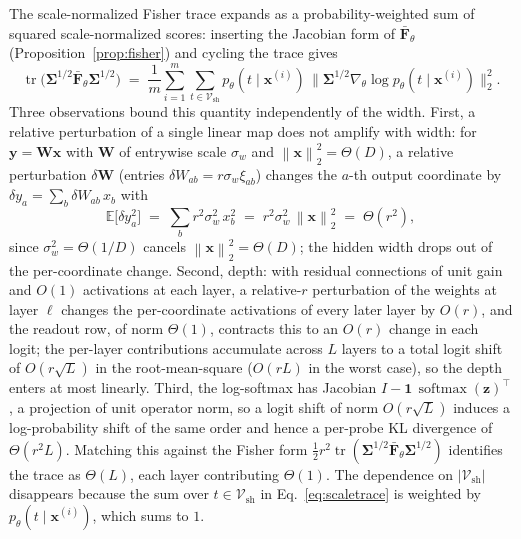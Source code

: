 \documentclass[11pt]{article}
\newcommand{\Vsh}{\mathcal{V}_{\mathrm{sh}}}
\newcommand{\E}{\mathbb{E}}
\newcommand{\norm}[1]{\left\lVert #1 \right\rVert}
\newcommand{\softmax}{\operatorname{softmax}}
\theoremstyle{definition}
\begin{document}
The scale-normalized Fisher trace expands as a probability-weighted sum of
squared scale-normalized scores: inserting the Jacobian form of
$\bar{\bm{F}}_\theta$ (Proposition~\ref{prop:fisher}) and cycling the trace
gives
\begin{equation}
  \operatorname{tr}\!\big(\bm{\Sigma}^{1/2}\bar{\bm{F}}_\theta
  \bm{\Sigma}^{1/2}\big)
  \;=\; \frac1m \sum_{i=1}^m \sum_{t \in \Vsh} p_\theta(t \mid \bm{x}^{(i)})\,
  \big\|\bm{\Sigma}^{1/2}\nabla_\theta \log p_\theta(t \mid \bm{x}^{(i)})\big\|_2^2.
  \label{eq:scaletrace}
\end{equation}
Three observations bound this quantity independently of the width. First, a
relative perturbation of a single linear map does not amplify with width: for
$\bm{y} = \bm{W} \bm{x}$ with $\bm{W}$ of entrywise scale $\sigma_w$ and
$\norm{\bm{x}}_2^2 = \Theta(D)$, a relative perturbation $\delta\bm{W}$ (entries
$\delta W_{ab} = r\sigma_w\xi_{ab}$) changes the $a$-th output coordinate by
$\delta y_a = \sum_b \delta W_{ab}\, x_b$ with
\begin{equation}
  \E\big[\delta y_a^2\big]
  \;=\; \sum_b r^2\sigma_w^2\, x_b^2
  \;=\; r^2\sigma_w^2\,\norm{\bm{x}}_2^2
  \;=\; \Theta(r^2),
  \label{eq:widthnorm}
\end{equation}
since $\sigma_w^2 = \Theta(1/D)$ cancels $\norm{\bm{x}}_2^2 = \Theta(D)$; the
hidden width drops out of the per-coordinate change. Second, depth: with
residual connections of unit gain and $O(1)$ activations at each layer, a
relative-$r$ perturbation of the weights at layer $\ell$ changes the
per-coordinate activations of every later layer by $O(r)$, and the readout row,
of norm $\Theta(1)$, contracts this to an $O(r)$ change in each logit; the
per-layer contributions accumulate across $L$ layers to a total logit shift of
$O(r\sqrt{L})$ in the root-mean-square ($O(rL)$ in the worst case), so the
depth enters at most linearly. Third, the log-softmax has Jacobian
$I - \mathbf{1}\,\softmax(\bm{z})^\top$, a projection of unit operator norm, so
a logit shift of norm $O(r\sqrt{L})$ induces a log-probability shift of the
same order and hence a per-probe KL divergence of $\Theta(r^2 L)$. Matching
this against the Fisher form $\tfrac12 r^2 \operatorname{tr}(\bm{\Sigma}^{1/2}
\bar{\bm{F}}_\theta\bm{\Sigma}^{1/2})$ identifies the trace as $\Theta(L)$,
each layer contributing $\Theta(1)$. The dependence on $|\Vsh|$ disappears
because the sum over $t \in \Vsh$ in Eq.~\eqref{eq:scaletrace} is weighted by
$p_\theta(t \mid \bm{x}^{(i)})$, which sums to $1$.
\end{document}
